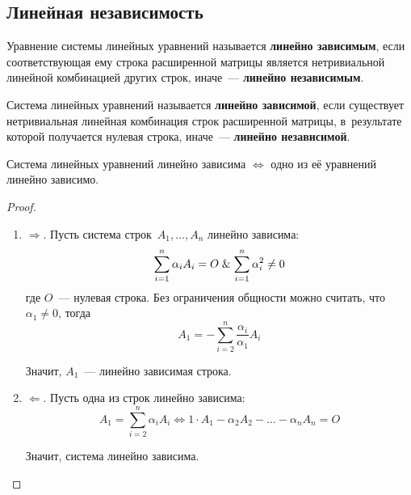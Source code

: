 \subsection{Линейная независимость}
Уравнение системы линейных уравнений называется \textbf{линейно зависимым}, если соответствующая ему строка расширенной матрицы является нетривиальной линейной комбинацией других строк, иначе~--- \textbf{линейно независимым}.

Система линейных уравнений называется \textbf{линейно зависимой}, если существует нетривиальная линейная комбинация строк расширенной матрицы, в~результате которой получается нулевая строка, иначе~--- \textbf{линейно независимой}.

\begin{statement}
Система линейных уравнений линейно зависима $\Leftrightarrow$ одно из её уравнений линейно зависимо.
\end{statement}
\begin{proof}
\begin{enumerate}
	\item $\Rightarrow$. Пусть система строк~$A_1, \ldots, A_n$ линейно зависима:
	\begin{equation*}
	\sum_{i=1}^n \alpha_i A_i = O \mathrel{\&} \sum_{i=1}^n \alpha_i^2 \neq 0
	\end{equation*}
	где $O$~--- нулевая строка. Без ограничения общности можно считать, что $\alpha_1 \neq 0$, тогда
	\begin{equation*}
	A_1 = -\sum_{i=2}^n \frac{\alpha_i}{\alpha_1} A_i
	\end{equation*}
	
	Значит, $A_1$~--- линейно зависимая строка.
	
	\item $\Leftarrow$. Пусть одна из строк линейно зависима:
	\begin{equation*}
	A_1 = \sum_{i=2}^n \alpha_i A_i \Leftrightarrow
	1 \cdot A_1 - \alpha_2 A_2 - \ldots - \alpha_n A_n = O
	\end{equation*}
	
	Значит, система линейно зависима.
\end{enumerate}
\end{proof}

